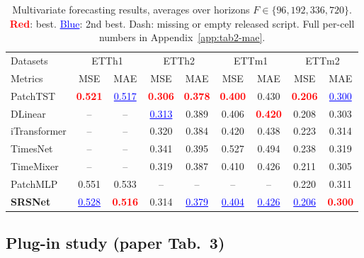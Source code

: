 \documentclass[10pt]{article}
\begin{document}
\begin{table}[t]
  \caption{Multivariate forecasting results, averages over horizons
    $F \in \{96, 192, 336, 720\}$. \textcolor{red}{\textbf{Red}}:
    best. \textcolor{blue}{\underline{Blue}}: 2nd best. Dash:
    missing or empty released script. Full per-cell
    numbers in Appendix~\ref{app:tab2-mae}.}
  \label{tab:tab2}
  \begin{center}
  \footnotesize
  \setlength{\tabcolsep}{4pt}
  \begin{tabular}{l|cc|cc|cc|cc}
    \toprule
    Datasets & \multicolumn{2}{c|}{ETTh1} & \multicolumn{2}{c|}{ETTh2}
             & \multicolumn{2}{c|}{ETTm1} & \multicolumn{2}{c}{ETTm2} \\
    Metrics  & MSE & MAE & MSE & MAE & MSE & MAE & MSE & MAE \\
    \midrule
    PatchTST     & \textcolor{red}{\textbf{0.521}} & \textcolor{blue}{\underline{0.517}} & \textcolor{red}{\textbf{0.306}} & \textcolor{red}{\textbf{0.378}} & \textcolor{red}{\textbf{0.400}} & 0.430 & \textcolor{red}{\textbf{0.206}} & \textcolor{blue}{\underline{0.300}} \\
    DLinear      & -- & -- & \textcolor{blue}{\underline{0.313}} & 0.389 & 0.406 & \textcolor{red}{\textbf{0.420}} & 0.208 & 0.303 \\
    iTransformer & -- & -- & 0.320 & 0.384 & 0.420 & 0.438 & 0.223 & 0.314 \\
    TimesNet     & -- & -- & 0.341 & 0.395 & 0.527 & 0.494 & 0.238 & 0.319 \\
    TimeMixer    & -- & -- & 0.319 & 0.387 & 0.410 & 0.426 & 0.211 & 0.305 \\
    PatchMLP     & 0.551 & 0.533 & -- & -- & -- & -- & 0.220 & 0.311 \\
    \midrule
    \textbf{SRSNet} & \textcolor{blue}{\underline{0.528}} & \textcolor{red}{\textbf{0.516}} & 0.314 & \textcolor{blue}{\underline{0.379}} & \textcolor{blue}{\underline{0.404}} & \textcolor{blue}{\underline{0.426}} & \textcolor{blue}{\underline{0.206}} & \textcolor{red}{\textbf{0.300}} \\
    \bottomrule
  \end{tabular}
  \end{center}
\end{table}

\subsection{Plug-in study (paper Tab.~3)}
\end{document}
